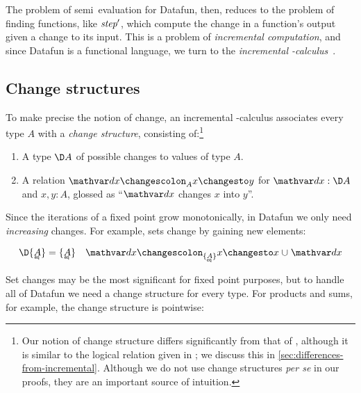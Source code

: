 The problem of semi\naive\ evaluation for Datafun, then, reduces to the problem
of finding functions, like $\text{\itshape step}'$, which compute the change in a
function's output given a change to its input.
%
This is a problem of \emph{incremental computation}, and since Datafun is a
functional language, we turn to the \emph{incremental
  \fn-calculus}~\citep{incremental,DBLP:conf/esop/GiarrussoRS19}.


\subsection{Change structures}
\label{sec:change-structures}

To make precise the notion of change, an incremental \fn-calculus associates
every type $A$ with a \emph{change structure}, consisting of:\footnote{Our
  notion of change structure differs significantly from that of
  \citet{incremental}, although it is similar to the logical relation given in
  \citet{DBLP:conf/esop/GiarrussoRS19}; we discuss this in
  \cref{sec:differences-from-incremental}. Although we do not use change
  structures \emph{per se} in our proofs, they are an important source of
  intuition.}

\begin{enumerate}
\item A type $\D A$ of possible changes to values of type $A$.
\item A relation $\changesat{A}{\dx}{x}{y}$ for $\dx : \D A$ and $x,y : A$,
  glossed as ``$\dx$ changes $x$ into $y$''.
\end{enumerate}

\noindent
Since the iterations of a fixed point grow monotonically, in Datafun we only
need \emph{increasing} changes.
%
For example, sets change by gaining new elements:

\begin{align*}
  \D\tseteq{A} &= \tseteq{A}
  &
  \changesat{\tseteq{A}}{\dx}{x}{x \cup \dx}
\end{align*}

Set changes may be the most significant for fixed point purposes, but to handle
all of Datafun we need a change structure for every type. For products and sums,
for example, the change structure is pointwise:


